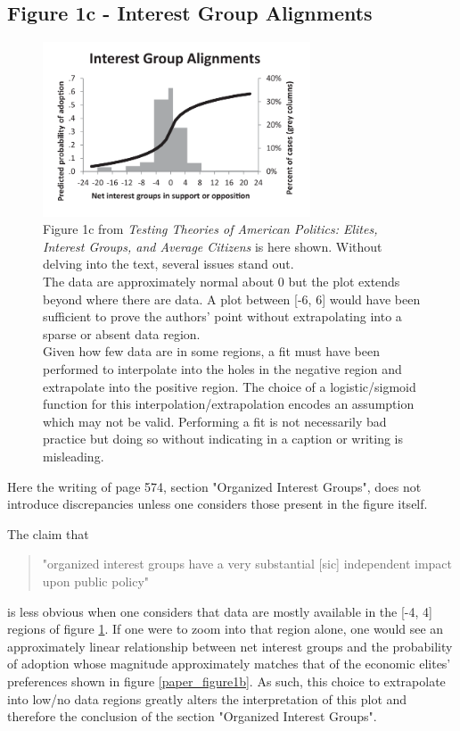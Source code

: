 \documentclass[]{article}
\begin{document}
\subsection{Figure 1c - Interest Group Alignments}
\begin{figure}[H]
	\begin{center}
		\includegraphics[width=300px]{./figures/paper/interest-group-preferences.png}
	\end{center}	
	\caption{Figure 1c from \textit{Testing Theories of American Politics: Elites, Interest Groups, and Average Citizens} is here shown. Without delving into the text, several issues stand out. \\The data are approximately normal about 0 but the plot extends beyond where there are data. A plot between [-6, 6] would have been sufficient to prove the authors' point without extrapolating into a sparse or absent data region. \\Given how few data are in some regions, a fit must have been performed to interpolate into the holes in the negative region and extrapolate into the positive region. The choice of a logistic/sigmoid function for this interpolation/extrapolation encodes an assumption which may not be valid. Performing a fit is not necessarily bad practice but doing so without indicating in a caption or writing is misleading.}
	\label{paper_figure1c}
\end{figure}

Here the writing of page 574, section "Organized Interest Groups", does not introduce discrepancies unless one considers those present in the figure itself.

The claim that \cite{gilens}
\begin{quotation}
	"organized interest groups have a very substantial [sic] independent impact upon public policy"
\end{quotation}
is less obvious when one considers that data are mostly available in the [-4, 4] regions of figure \ref{paper_figure1c}. 
If one were to zoom into that region alone, one would see an approximately linear relationship between net interest groups and the probability of adoption whose magnitude approximately matches that of the economic elites' preferences shown in figure \ref{paper_figure1b}.
As such, this choice to extrapolate into low/no data regions greatly alters the interpretation of this plot and therefore the conclusion of the section "Organized Interest Groups".\\
\end{document}

